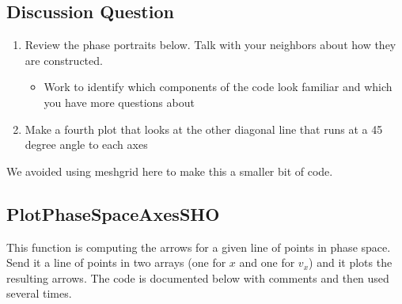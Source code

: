 \documentclass[letterpaper,10pt,english]{jupyterBook}
\begin{document}
\subsection{Discussion Question}
\label{\detokenize{content/1_mechanics/dynamical_1:discussion-question}}
\sphinxAtStartPar
{}
\begin{enumerate}
%
\item {} 
\sphinxAtStartPar
Review the phase portraits below. Talk with your neighbors about how they are constructed.
\begin{itemize}
\item {} 
\sphinxAtStartPar
Work to identify which components of the code look familiar and which you have more questions about

\end{itemize}

\item {} 
\sphinxAtStartPar
Make a fourth plot that looks at the other diagonal line that runs at a 45 degree angle to each axes

\end{enumerate}

\sphinxAtStartPar
{} We avoided using meshgrid here to make this a smaller bit of code.


\subsection{PlotPhaseSpaceAxesSHO}
\label{\detokenize{content/1_mechanics/dynamical_1:plotphasespaceaxessho}}
\sphinxAtStartPar
This function is computing the arrows for a given line of points in phase space. Send it a line of points in two arrays (one for \(x\) and one for \(v_x\)) and it plots the resulting arrows. The code is documented below with comments and then used several times.
\end{document}
